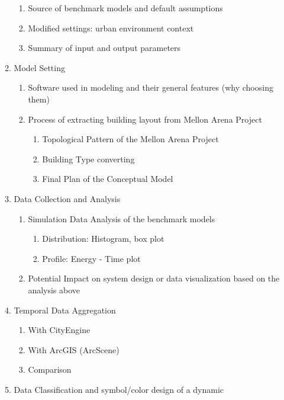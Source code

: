 \documentclass[12pt]{article}
\begin{document}
\begin{enumerate}
\begin{enumerate}[label*=\arabic*.]
    \begin{enumerate}[label*=\arabic*.]
    \item Source of benchmark models and default assumptions
    \item Modified settings: urban environment context
    \item Summary of input and output parameters
    \end{enumerate}
  \item Model Setting
    \begin{enumerate}[label*=\arabic*.]
    \item Software used in modeling and their general features (why
      choosing them)
    \item Process of extracting building layout from Mellon Arena
      Project
      \begin{enumerate}[label*=\arabic*.]
      \item Topological Pattern of the Mellon Arena Project
      \item Building Type converting
      \item Final Plan of the Conceptual Model
      \end{enumerate}
    \end{enumerate}
    \item Data Collection and Analysis
      \begin{enumerate}[label*=\arabic*.]
      \item Simulation Data Analysis of the benchmark models
        \begin{enumerate}[label*=\arabic*.]
        \item Distribution: Histogram, box plot
        \item Profile: Energy - Time plot
        \end{enumerate}
      \item Potential Impact on system design or data visualization
        based on the analysis above
      \end{enumerate}
    \item Temporal Data Aggregation
      \begin{enumerate}[label*=\arabic*.]
      \item With CityEngine
      \item With ArcGIS (ArcScene)
      \item Comparison
      \end{enumerate}
  \item Data Classification and symbol/color design of a dynamic

\end{enumerate}
\end{enumerate}
\end{document}

